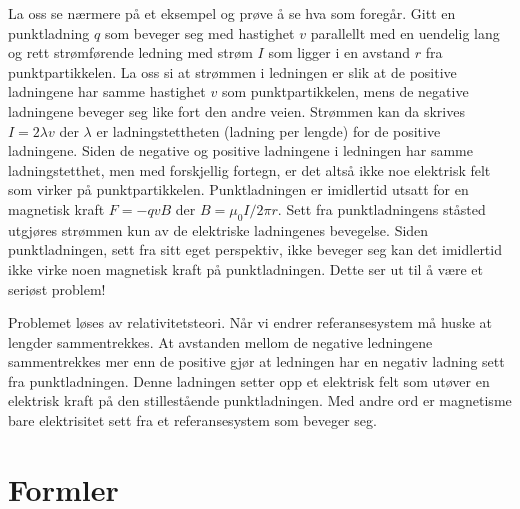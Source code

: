 \documentclass[twoside,utf8]{article}
\begin{document}
  La oss se nærmere på et eksempel og prøve å se hva som foregår. Gitt en punktladning $q$ som beveger seg med hastighet $v$ parallellt med en uendelig lang og rett strømførende ledning med strøm $I$ som ligger i en avstand $r$ fra punktpartikkelen. La oss si at strømmen i ledningen er slik at de positive ladningene har samme hastighet $v$ som punktpartikkelen, mens de negative ladningene beveger seg like fort den andre veien. Strømmen kan da skrives $I=2\lambda v$ der $\lambda$ er ladningstettheten (ladning per lengde) for de positive ladningene. Siden de negative og positive ladningene i ledningen har samme ladningstetthet, men med forskjellig fortegn, er det altså ikke noe elektrisk felt som virker på punktpartikkelen. Punktladningen er imidlertid utsatt for en magnetisk kraft $F=-qvB$ der $B=\mu_0I/2\pi r$. Sett fra punktladningens ståsted utgjøres strømmen kun av de elektriske ladningenes bevegelse. Siden punktladningen, sett fra sitt eget perspektiv, ikke beveger seg kan det imidlertid ikke virke noen magnetisk kraft på punktladningen. Dette ser ut til å være et seriøst problem!


  Problemet løses av relativitetsteori. Når vi endrer referansesystem må huske at lengder sammentrekkes. At avstanden mellom de negative ledningene sammentrekkes mer enn de positive gjør at ledningen har en negativ ladning sett fra punktladningen. Denne ladningen setter opp et elektrisk felt som utøver en elektrisk kraft på den stillestående punktladningen. Med andre ord er magnetisme bare elektrisitet sett fra et referansesystem som beveger seg.













\newpage



\part*{Formler}
\end{document}
